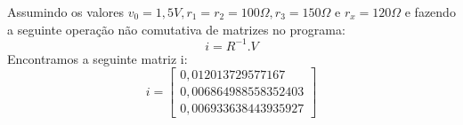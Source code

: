 \documentclass[a4wide]{report}
\begin{document}
Assumindo os valores  $v_{0}=1,5 V,r_{1}=r_{2}= 100 \Omega, r_{3}=150 \Omega$ e $ r_{x}=120 \Omega $ e fazendo a seguinte operação não comutativa de matrizes no programa:
\begin{equation}
i=R^{-1}.V
\end{equation}
Encontramos a seguinte matriz i:
\[
i=
  \begin{bmatrix}
   0,012013729577167 \\
   0,006864988558352403 \\
    0,006933638443935927
  \end{bmatrix}
\]
\end{document}
